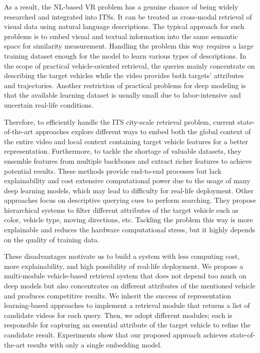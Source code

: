 As a result, the NL-based VR problem has a genuine chance of being widely researched and integrated into ITSs.
It can be treated as cross-modal retrieval of visual data using natural language descriptions. The typical approach for such problems is to embed visual and textual information into the same semantic space for similarity measurement. 
Handling the problem this way requires a large training dataset enough for the model to learn various types of descriptions.
In the scope of practical vehicle-oriented retrieval, the queries mainly concentrate on describing the target vehicles while the video provides both targets’ attributes and trajectories. 
Another restriction of practical problems for deep modeling is that the available learning dataset is usually small due to labor-intensive and uncertain real-life conditions. 

Therefore, to efficiently handle the ITS city-scale retrieval problem, current state-of-the-art approaches explore different ways to embed both the global context of the entire video and local context containing target vehicle features for a better representation. Furthermore, to tackle the shortage of valuable datasets, they ensemble features from multiple backbones and extract richer features to achieve potential results. 
These methods provide end-to-end processes but lack explainability and cost extensive computational power due to the usage of many deep learning models, which may lead to difficulty for real-life deployment.
Other approaches focus on descriptive querying cues to perform searching. They propose hierarchical systems to filter different attributes of the target vehicle such as color, vehicle type, moving directions, etc. Tackling the problem this way is more explainable and reduces the hardware computational stress, but it highly depends on the quality of training data. 

These disadvantages motivate us to build a system with less computing cost, more explainability, and high possibility of real-life deployment.
We propose a multi-module vehicle-based retrieval system that does not depend too much on deep models but also concentrates on different attributes of the mentioned vehicle and produces competitive results.
We inherit the success of representation learning-based approaches to implement a retrieval module that returns a list of candidate videos for each query. Then, we adopt different modules; each is responsible for capturing an essential attribute of the target vehicle to refine the candidate result. Experiments show that our proposed approach achieves state-of-the-art results with only a single embedding model.

